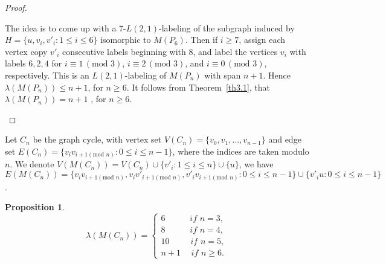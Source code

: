\documentclass{article}
\newtheorem{prop} {Proposition}
\newtheorem{open problem} {Open Problem}
\numberwithin{lemma}{section}
\numberwithin{theorem}{section}
\numberwithin{cor}{section}
\numberwithin{prop}{section}
\numberwithin{con}{section}
\numberwithin{claim}{section}
\numberwithin{obs}{section}
\numberwithin{dnt}{section}
\begin{document}
\begin{proof}
\begin{itemize}
		The idea is to come up with a 7-$L(2,1)$-labeling of the subgraph induced by $H=\{u,v_i,v'_i : 1\leq i\leq 6 \}$  isomorphic to $M(P_6)$. Then if $i\geq 7$, assign each vertex copy $v'_i$  consecutive labels beginning with $8$, and label the vertices $v_i$ with labels $6,2,4$  for $i\equiv 1\,(\text{mod } 3)$, $i\equiv 2\, (\text{mod } 3)$, and $i\equiv 0\, (\text{mod } 3)$, respectively. This is an $L(2,1)$-labeling of $M(P_n)$ with span $n+1$. 
		Hence $\lambda(M(P_n))\leq n+1$, for $n\geq 6$. It follows from Theorem~\ref{th3.1}, that $\lambda(M(P_n))= n+1$ , for $n\geq 6$.
	\end{itemize}
	\vspace{-4\topsep}
	\end{proof}
Let $C_n$ be the graph cycle, with vertex set $V(C_n)=\{v_0,v_1,\ldots,v_{n-1}\}$ and edge set $E(C_n)=\{v_iv_{i+1(\text{mod }n)} : 0\leq i \leq n-1\}$, where the indices are taken modulo $n$. We denote $V(M( C_n))= V(C_n)\cup  \{v'_i : 1\leq i \leq n\} \cup \{u\}$, we have $E(M(C_n))=\{v_iv_{i+1(\text{mod }n)}, v_iv'_{i+1(\text{mod }n)},v'_iv_{i+1(\text{mod }n)} : 0\leq i \leq n-1 \} \cup \{v'_iu : 0\leq i \leq n-1\}$.
\begin{prop}\label{thm3.7}
	$$ \lambda(M(C_n))=\begin{cases}
	6 \hspace{35pt}if\,\, n=3, \\
	8 \hspace{35pt}if\,\, n=4, \\
	10 \hspace{30pt}if\,\, n=5, \\
	n+1 \hspace{15pt}if\,\,n \geq 6.	
	\end{cases}  $$		
\end{prop}
\end{document}
